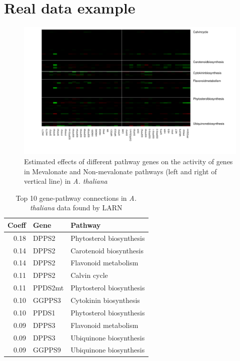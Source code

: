 \section{Real data example}
\label{sec:regression-sec6}

\begin{figure}
\begin{center}
\includegraphics[width=.8\textwidth]{Chapter-regression/cropped_gene_heatmap1}

\caption{Estimated effects of different pathway genes on the activity of genes in Mevalonate and Non-mevalonate pathways (left and right of vertical line) in \textit{A. thaliana}}
\label{fig:coeffplots}
\end{center}
\end{figure}

\begin{table}[h]
\centering
\begin{footnotesize}
\begin{tabular}{rll}
  \hline
Coeff & Gene & Pathway \\ 
  \hline
0.18 & DPPS2 & Phytosterol biosynthesis \\ 
0.14 & DPPS2 & Carotenoid biosynthesis \\ 
0.14 & DPPS2 & Flavonoid metabolism \\ 
0.11 & DPPS2 & Calvin cycle \\ 
0.11 & PPDS2mt & Phytosterol biosynthesis \\ 
0.10 & GGPPS3 & Cytokinin biosynthesis \\ 
0.10 & PPDS1 & Phytosterol biosynthesis \\ 
0.09 & DPPS3 & Flavonoid metabolism \\ 
0.09 & DPPS3 & Ubiquinone biosynthesis \\ 
0.09 & GGPPS9 & Ubiquinone biosynthesis \\ 
\hline
\end{tabular}
\caption{Top 10 gene-pathway connections in {\it A. thaliana} data found by LARN}
\label{table:coefftable}
\end{footnotesize}
\end{table}

